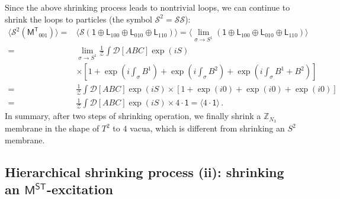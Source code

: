 \documentclass[11pt,nofootinbib,preprint]{revtex4-1}
\begin{document}
Since the above shrinking process leads to nontrivial loops, we can continue to shrink the loops to particles (the symbol $\mathcal{S}^2=\mathcal{S}\mathcal{S}$):
\begin{align}
	\langle \mathcal{S} ^2\left( \mathsf{M^T}_{001} \right) \rangle =&\langle \mathcal{S} \left( \mathsf{1}\oplus \mathsf{L}_{100}\oplus \mathsf{L}_{010}\oplus \mathsf{L}_{110} \right) \rangle =\langle \underset{\sigma \rightarrow S^1}{\lim}\left( \mathsf{1}\oplus \mathsf{L}_{100}\oplus \mathsf{L}_{010}\oplus \mathsf{L}_{110} \right) \rangle \nonumber
	\\
	=&\underset{\sigma \rightarrow S^1}{\lim}\frac{1}{\mathcal{Z}}\int{\mathcal{D} \left[ABC  \right] \exp \left( iS \right)}\nonumber
	\\
	&\times \left[ 1+\exp \left( i\int_{\sigma}{B^1} \right) +\exp \left( i\int_{\sigma}{B^2} \right) +\exp \left( i\int_{\sigma}{B^1+B^2} \right) \right] \nonumber
	\\
	=&\frac{1}{\mathcal{Z}}\int{\mathcal{D} \left[ ABC \right] \exp \left( iS \right) \times \left[ 1+\exp \left( i0 \right) +\exp \left( i0 \right) +\exp \left( i0 \right) \right]}\nonumber
	\\
	=&\frac{1}{\mathcal{Z}}\int{\mathcal{D} \left[ ABC \right] \exp \left( iS \right) \times 4\cdot \mathsf{1}}=\langle 4\cdot \mathsf{1} \rangle \,.
\end{align}
In summary,  after two steps of shrinking operation, we finally shrink a $\mathbb{Z}_{N_3}$ membrane in the shape of $T^2$ to $4$ vacua, which is    different from shrinking an $S^2$ membrane.

\subsection{Hierarchical shrinking process (ii): shrinking an $\mathsf{M^{ST}}$-excitation}
\end{document}

